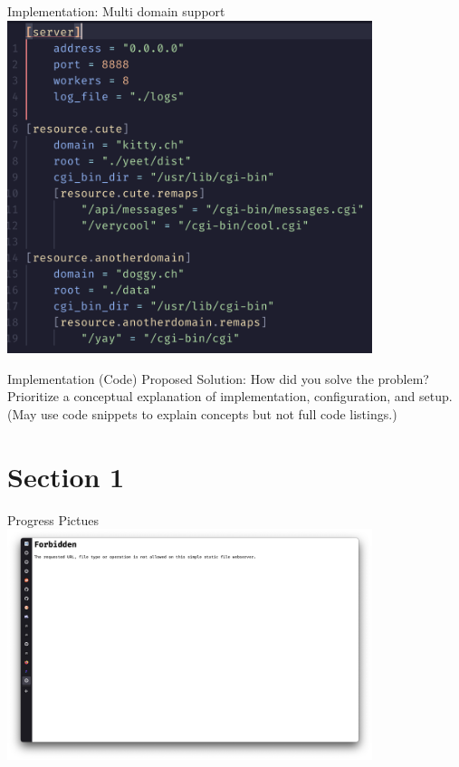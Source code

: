 \documentclass[aspectratio=169]{beamer}
\begin{document}
\begin{frame}[c]{Implementation: Multi domain support}
    \centering
    \includegraphics[width=0.8\textwidth,height=0.8\textheight,keepaspectratio]{config.png}
\end{frame}

\begin{frame}[c]{Implementation (Code)}
    Proposed Solution: How did you solve the problem? Prioritize a conceptual
    explanation of implementation, configuration, and setup. (May use code
    snippets to explain concepts but not full code listings.)
\end{frame}

\section{Section 1}	%

\begin{frame}[c]{Progress Pictues}
  \centering
  \includegraphics[width=0.8\textwidth,height=\textheight,keepaspectratio]{00_errors.png}
\end{frame}
\end{document}
